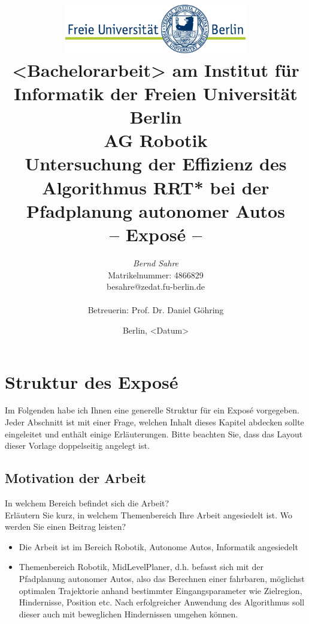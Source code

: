 \documentclass[pdftex,a4paper,12pt]{scrartcl}
\title{\includegraphics[width=0.6\textwidth]{pics/FU_logo.pdf}\\
{\small <Bachelorarbeit> am Institut für Informatik der Freien Universität Berlin}\\
{\small AG Robotik}\\
[6ex]
{\LARGE Untersuchung der Effizienz des Algorithmus RRT* bei der Pfadplanung autonomer Autos}\\
{\normalsize-- Exposé --}}
\author{
{\emph{\normalsize Bernd Sahre}}\\
{\normalsize Matrikelnummer: 4866829}\\
{\normalsize besahre@zedat.fu-berlin.de}\\\\
{\normalsize Betreuerin: Prof. Dr. Daniel Göhring}
}
\date{\normalsize Berlin, <Datum>}
\newcommand{\blankpage}{
\newpage
\thispagestyle{empty}
\mbox{}
\newpage
}
\begin{document}
\maketitle 

\thispagestyle{empty}  %

\blankpage


\setcounter{page}{1} %

\section{Struktur des Exposé}
Im Folgenden habe ich Ihnen eine generelle Struktur für ein Exposé vorgegeben. Jeder Abschnitt ist mit einer Frage, welchen Inhalt dieses Kapitel abdecken sollte eingeleitet und enthält einige Erläuterungen. Bitte beachten Sie, dass das Layout dieser Vorlage doppelseitig angelegt ist.

\subsection{Motivation der Arbeit}
In welchem Bereich befindet sich die Arbeit? \\
Erläutern Sie kurz, in welchem Themenbereich Ihre Arbeit angesiedelt ist. Wo werden Sie einen Beitrag leisten? \\
\begin{itemize}
	\item  Die Arbeit ist im Bereich Robotik, Autonome Autos, Informatik angesiedelt
	
	\item Themenbereich Robotik, MidLevelPlaner, d.h. befasst sich mit der Pfadplanung autonomer Autos, also das Berechnen einer fahrbaren, möglichst optimalen Trajektorie anhand bestimmter Eingangsparameter wie Zielregion, Hindernisse, Position etc. Nach erfolgreicher Anwendung des Algorithmus soll dieser auch mit beweglichen Hindernissen umgehen können.
\end{itemize} 
\end{document}
